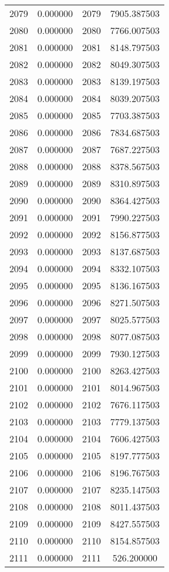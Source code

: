 \documentclass[12pt]{article}
\begin{document}
\begin{longtable}{@{}cccc@{}}
2079 & 0.000000 & 2079 & 7905.387503 \\
2080 & 0.000000 & 2080 & 7766.007503 \\
2081 & 0.000000 & 2081 & 8148.797503 \\
2082 & 0.000000 & 2082 & 8049.307503 \\
2083 & 0.000000 & 2083 & 8139.197503 \\
2084 & 0.000000 & 2084 & 8039.207503 \\
2085 & 0.000000 & 2085 & 7703.387503 \\
2086 & 0.000000 & 2086 & 7834.687503 \\
2087 & 0.000000 & 2087 & 7687.227503 \\
2088 & 0.000000 & 2088 & 8378.567503 \\
2089 & 0.000000 & 2089 & 8310.897503 \\
2090 & 0.000000 & 2090 & 8364.427503 \\
2091 & 0.000000 & 2091 & 7990.227503 \\
2092 & 0.000000 & 2092 & 8156.877503 \\
2093 & 0.000000 & 2093 & 8137.687503 \\
2094 & 0.000000 & 2094 & 8332.107503 \\
2095 & 0.000000 & 2095 & 8136.167503 \\
2096 & 0.000000 & 2096 & 8271.507503 \\
2097 & 0.000000 & 2097 & 8025.577503 \\
2098 & 0.000000 & 2098 & 8077.087503 \\
2099 & 0.000000 & 2099 & 7930.127503 \\
2100 & 0.000000 & 2100 & 8263.427503 \\
2101 & 0.000000 & 2101 & 8014.967503 \\
2102 & 0.000000 & 2102 & 7676.117503 \\
2103 & 0.000000 & 2103 & 7779.137503 \\
2104 & 0.000000 & 2104 & 7606.427503 \\
2105 & 0.000000 & 2105 & 8197.777503 \\
2106 & 0.000000 & 2106 & 8196.767503 \\
2107 & 0.000000 & 2107 & 8235.147503 \\
2108 & 0.000000 & 2108 & 8011.437503 \\
2109 & 0.000000 & 2109 & 8427.557503 \\
2110 & 0.000000 & 2110 & 8154.857503 \\
2111 & 0.000000 & 2111 & 526.200000 \\

\end{longtable}
\end{document}
